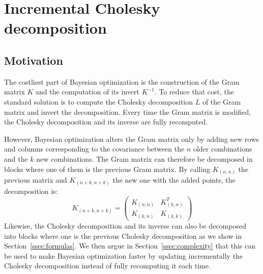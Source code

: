 







\section{Incremental Cholesky decomposition}
\label{sec:cholesky}

\subsection{Motivation}
\label{ssec:motivation}

The costliest part of Bayesian optimization is the construction of the Gram matrix $K$ and the computation of its invert $K^{-1}$. To reduce that cost, the standard solution is to compute the Cholesky decomposition $L$ of the Gram matrix and invert the decomposition. Every time the Gram matrix is modified, the Cholesky decomposition and its inverse are fully recomputed.

However, Bayesian optimization alters the Gram matrix only by adding new rows and columns corresponding to the covariance between the $n$ older combinations and the $k$ new combinations. The Gram matrix can therefore be decomposed in blocks where one of them is the previous Gram matrix. By calling $K_{(n,n)}$ the previous matrix and $K_{(n+k,n+k)}$ the new one with the added points, the decomposition is:
\begin{equation}
	K_{(n+k,n+k)} = 
	\begin{pmatrix}
    K_{(n,n)} & K_{(k,n)}^T \\
    K_{(k,n)} & K_{(k,k)}
  \end{pmatrix}
\end{equation}
Likewise, the Cholesky decomposition and its inverse can also be decomposed into blocks where one is the previous Cholesky decomposition as we show in Section~\ref{ssec:formulas}. We then argue in Section~\ref{ssec:complexity} that this can be used to make Bayesian optimization faster by updating incrementally the Cholesky decomposition instead of fully recomputing it each time.

